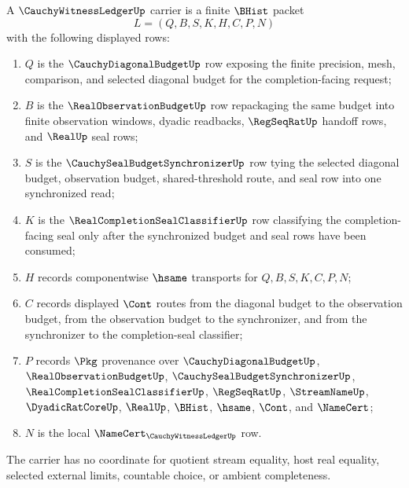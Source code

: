 \begin{definition}
\label{def:cauchy-witness-ledger-carrier}
A $\CauchyWitnessLedgerUp$ carrier is a finite $\BHist$ packet
$$
L=(Q,B,S,K,H,C,P,N)
$$
with the following displayed rows:
\begin{enumerate}
\item $Q$ is the $\CauchyDiagonalBudgetUp$ row exposing the finite precision, mesh, comparison, and selected diagonal budget for the completion-facing request;
\item $B$ is the $\RealObservationBudgetUp$ row repackaging the same budget into finite observation windows, dyadic readbacks, $\RegSeqRatUp$ handoff rows, and $\RealUp$ seal rows;
\item $S$ is the $\CauchySealBudgetSynchronizerUp$ row tying the selected diagonal budget, observation budget, shared-threshold route, and seal row into one synchronized read;
\item $K$ is the $\RealCompletionSealClassifierUp$ row classifying the completion-facing seal only after the synchronized budget and seal rows have been consumed;
\item $H$ records componentwise $\hsame$ transports for $Q,B,S,K,C,P,N$;
\item $C$ records displayed $\Cont$ routes from the diagonal budget to the observation budget, from the observation budget to the synchronizer, and from the synchronizer to the completion-seal classifier;
\item $P$ records $\Pkg$ provenance over $\CauchyDiagonalBudgetUp$, $\RealObservationBudgetUp$, $\CauchySealBudgetSynchronizerUp$, $\RealCompletionSealClassifierUp$, $\RegSeqRatUp$, $\StreamNameUp$, $\DyadicRatCoreUp$, $\RealUp$, $\BHist$, $\hsame$, $\Cont$, and $\NameCert$;
\item $N$ is the local $\NameCert_{\CauchyWitnessLedgerUp}$ row.
\end{enumerate}
The carrier has no coordinate for quotient stream equality, host real equality, selected external limits, countable choice, or ambient completeness.
\end{definition}

